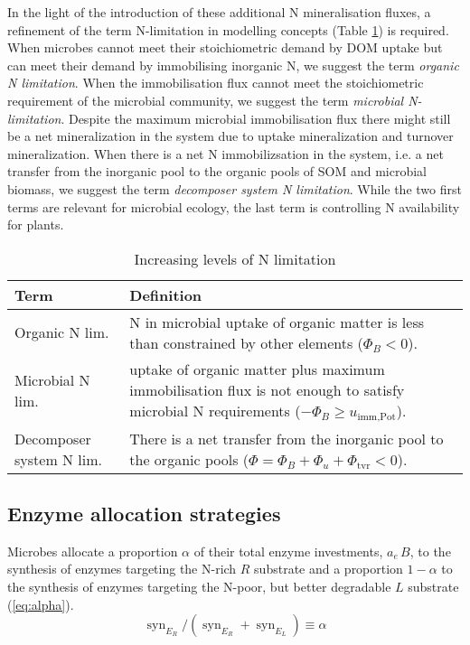 In the light of the introduction of these additional N mineralisation fluxes, a
refinement of the term N-limitation in modelling concepts (Table
\ref{tab:NutrientLimDefs}) is required.
When microbes cannot meet their stoichiometric demand by DOM uptake but can
meet their demand by immobilising inorganic N, we suggest the term 
\textit{organic N limitation}.
When the immobilisation flux cannot meet the stoichiometric requirement of the
microbial community, we suggest the term \textit{microbial N-limitation}.
Despite the maximum microbial immobilisation flux there might still be a net
mineralization in the system due to uptake mineralization and turnover
mineralization. When there is a net N
immobilizsation in the system, i.e. a net transfer from the inorganic pool to
the organic pools of SOM and microbial biomass, we suggest the term 
\textit{decomposer system N limitation}. While the two first terms are relevant
for microbial ecology, the last term is controlling N availability for plants.

\begin{table}[t]
\caption{Increasing levels of N limitation \label{tab:NutrientLimDefs}}
\centering
\begin{tabular}{p{2.3cm}p{5.5cm}}
\hline
Term &  Definition \\
\hline
Organic N lim. & N in microbial uptake of organic matter is less than 
constrained by other elements (${\Phi_B < 0}$).
\\
Microbial N lim. & uptake of organic matter plus maximum immobilisation flux is
not enough to satisfy microbial N requirements (${-\Phi_B \ge
u_{\operatorname{imm,Pot}}}$).
\\
Decomposer system N lim. & There is a net transfer from the inorganic pool to
the organic pools (${\Phi = \Phi_B+\Phi_u+\Phi_{\operatorname{tvr}}<0}$).
\\
\hline
\end{tabular}
\end{table}
 
\subsection{ Enzyme allocation strategies} 
\label{sec:AllocStrategies}

Microbes allocate a proportion $\alpha$ of their total enzyme investments,
$a_e\,B$, to the synthesis of enzymes targeting the N-rich $R$ substrate and
a proportion $1 - \alpha$ to the synthesis of enzymes targeting the N-poor, but
better degradable $L$ substrate (\ref{eq:alpha}). 
\begin{equation} 
\label{eq:alpha}
\operatorname{syn}_{E_R} /
(\operatorname{syn}_{E_R} + \operatorname{syn}_{E_L}) \equiv \alpha
\end{equation}

